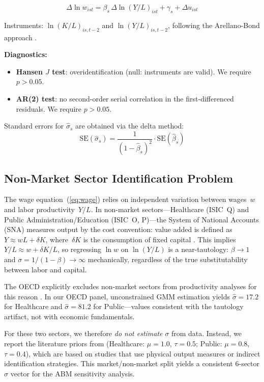 \documentclass[11pt,a4paper]{article}
\begin{document}
\begin{equation}
\Delta \ln w_{ist} = \beta_s \, \Delta \ln(Y/L)_{ist} + \gamma_s + \Delta u_{ist}
\end{equation}

Instruments: $\ln(K/L)_{is,t-2}$ and $\ln(Y/L)_{is,t-2}$, following the Arellano-Bond approach \autocite{arellano1991tests}.

\textbf{Diagnostics:}
\begin{itemize}
    \item \textbf{Hansen $J$ test}: overidentification (null: instruments are valid). We require $p > 0.05$.
    \item \textbf{AR(2) test}: no second-order serial correlation in the first-differenced residuals. We require $p > 0.05$.
\end{itemize}

Standard errors for $\hat{\sigma}_s$ are obtained via the delta method:
\begin{equation}
\text{SE}(\hat{\sigma}_s) = \frac{1}{(1 - \hat{\beta}_s)^2} \cdot \text{SE}(\hat{\beta}_s)
\end{equation}

\subsection{Non-Market Sector Identification Problem}
\label{sec:sna}

The wage equation~(\ref{eq:wage}) relies on independent variation between wages~$w$ and labor productivity~$Y/L$.
In non-market sectors---Healthcare (ISIC~Q) and Public Administration/Education (ISIC~O, P)---the System of National Accounts (SNA) measures output by the cost convention: value added is defined as $Y \approx wL + \delta K$, where~$\delta K$ is the consumption of fixed capital \autocite{oecd2024sna}.
This implies $Y/L \approx w + \delta K/L$, so regressing $\ln w$ on $\ln(Y/L)$ is a near-tautology: $\beta \to 1$ and $\sigma = 1/(1-\beta) \to \infty$ mechanically, regardless of the true substitutability between labor and capital.

The OECD explicitly excludes non-market sectors from productivity analyses for this reason \autocite{oecd2024sna}.
In our OECD panel, unconstrained GMM estimation yields $\hat{\sigma} = 17.2$ for Healthcare and $\hat{\sigma} = 81.2$ for Public---values consistent with the tautology artifact, not with economic fundamentals.

For these two sectors, we therefore \emph{do not estimate} $\sigma$ from data.
Instead, we report the literature priors from \autocite{knoblach2020what} (Healthcare: $\mu=1.0$, $\tau=0.5$; Public: $\mu=0.8$, $\tau=0.4$), which are based on studies that use physical output measures or indirect identification strategies.
This market/non-market split yields a consistent 6-sector $\sigma$ vector for the ABM sensitivity analysis.
\end{document}
